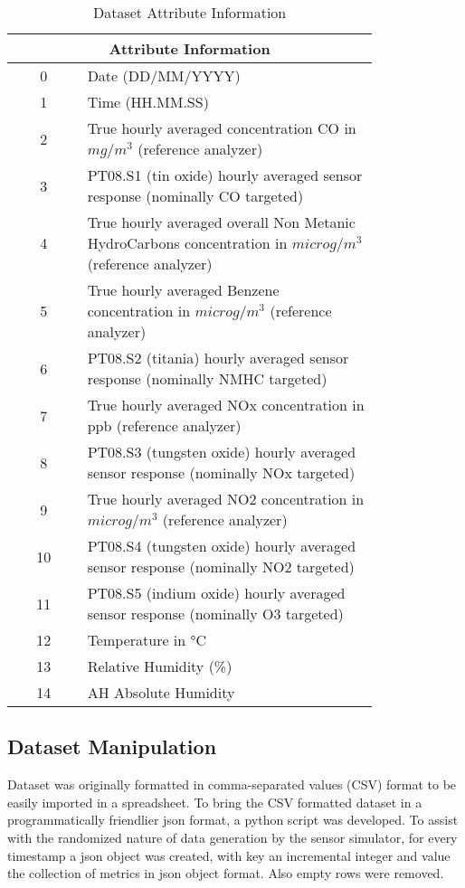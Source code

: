 \begin{table}[!h]
\begin{tabular}{|c|p{0.8\linewidth}|}
    \hline
    \multicolumn{2}{|c|}{\textbf{Attribute Information}} \\
    \hline
    \hline
    0& Date (DD/MM/YYYY) \\ \hline
    1& Time (HH.MM.SS) \\ \hline
    2& True hourly averaged concentration CO in $mg/m^3$ (reference analyzer) \\ \hline
    3& PT08.S1 (tin oxide) hourly averaged sensor response (nominally CO targeted) \\ \hline
    4& True hourly averaged overall Non Metanic HydroCarbons concentration in $microg/m^3$ (reference analyzer) \\ \hline
    5& True hourly averaged Benzene concentration in $microg/m^3$ (reference analyzer) \\ \hline
    6& PT08.S2 (titania) hourly averaged sensor response (nominally NMHC targeted) \\ \hline
    7& True hourly averaged NOx concentration in ppb (reference analyzer) \\ \hline
    8& PT08.S3 (tungsten oxide) hourly averaged sensor response (nominally NOx targeted) \\ \hline
    9& True hourly averaged NO2 concentration in $microg/m^3$ (reference analyzer) \\ \hline
    10& PT08.S4 (tungsten oxide) hourly averaged sensor response (nominally NO2 targeted) \\ \hline
    11& PT08.S5 (indium oxide) hourly averaged sensor response (nominally O3 targeted) \\ \hline
    12& Temperature in °C \\ \hline
    13& Relative Humidity (\%) \\ \hline
    14& AH Absolute Humidity  \\ \hline
\end{tabular}
\centering
\caption{Dataset Attribute Information}
\label{fig:dataset_attri}
\end{table}

\subsection{Dataset Manipulation}
Dataset was originally formatted in comma-separated values (CSV) format to be easily imported in a spreadsheet. To bring the CSV formatted dataset in a programmatically friendlier json format, a python script was developed. 
To assist with the randomized nature of data generation by the sensor simulator, for every timestamp a json object was created, with key an incremental integer and value the collection of metrics in json object format. Also empty rows were removed.

